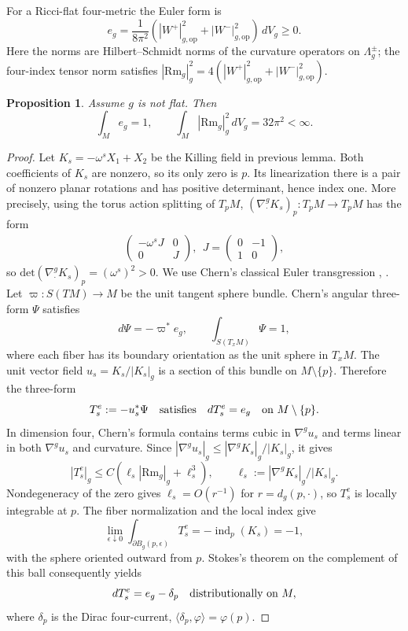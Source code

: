 \documentclass[letterpaper]{amsart}
\newtheorem{prop}[thm]{Proposition}
\theoremstyle{definition}
\theoremstyle{remark}
\def\Rm{\mathrm{Rm}}
\begin{document}
For a Ricci-flat four-metric the Euler form is
\[
 e_g=\frac1{8\pi^2}
       (|W^+|_{g,\mathrm{op}}^2+|W^-|_{g,\mathrm{op}}^2)\,dV_g\ge0.
\]
Here the norms are Hilbert--Schmidt norms of the curvature operators on
$\Lambda_g^\pm$; the four-index tensor norm satisfies
$|\Rm_g|_g^2=4(|W^+|_{g,\mathrm{op}}^2+|W^-|_{g,\mathrm{op}}^2)$.

\begin{prop}\label{notes-Euler-energy}
Assume $g$ is not flat. Then
\[
 \int_M e_g=1,\qquad \int_M|\Rm_g|_g^2\,dV_g = 32 \pi ^2<\infty.
\]
\end{prop}
\begin{proof}
	Let $K_s= -\omega^s X_1+ X_2$ be the Killing field in previous lemma. 
Both coefficients of $K_s$ are nonzero, so its only zero is $p$.
Its linearization there is a pair of nonzero planar rotations and has
positive determinant, hence index one. More precisely, using the torus action splitting of $T_pM$, $(\nabla ^{g}_{\cdot } K_s)_p: T_pM \to T_p M$ has the form
\begin{align*}
	\begin{pmatrix} -\omega^s J & 0 \\ 0 & J \end{pmatrix} , \ \ J = \begin{pmatrix} 0 & -1 \\ 1 & 0 \end{pmatrix} ,
\end{align*}
so $\mathrm{det}(\nabla ^{g}_{\cdot } K_s)_p = (\omega^s)^2 >0	.$
We use Chern's classical Euler transgression
\cite[Sections~2--3]{notes-Chern1944},
\cite[Section~1, (9)--(11), and Section~2]{notes-Chern1945}.
Let $\varpi:S(TM)\to M$ be the unit tangent sphere bundle. Chern's angular
three-form $\Psi$ satisfies
\[
 d\Psi=-\varpi^*e_g,\qquad \int_{S(T_xM)}\Psi=1,
\]
where each fiber has its boundary orientation as the unit sphere in $T_xM$.
The unit vector field $u_s=K_s/|K_s|_g$ is a section of this bundle on
$M\setminus\{p\}$. Therefore the three-form
\[
 T_s^e:=-u_s^*\Psi
 \quad\hbox{satisfies}\quad dT_s^e=e_g
 \quad\hbox{on }M\setminus\{p\}.
\]
In dimension four, Chern's formula contains terms cubic in $\nabla^g u_s$
and terms linear in both $\nabla^g u_s$ and curvature. Since
$|\nabla^g u_s|_g\le |\nabla^gK_s|_g/|K_s|_g$, it gives
\[
 |T_s^e|_g\le C(\ell_s|\Rm_g|_g+\ell_s^3),\qquad
 \ell_s:=|\nabla^gK_s|_g/|K_s|_g.
\]
Nondegeneracy of the zero gives $\ell_s=O(r^{-1})$ for
$r=d_g(p,\cdot)$, so $T_s^e$ is locally integrable at $p$.
The fiber normalization and the local index give
\[
 \lim_{\epsilon\downarrow0}\int_{\partial B_g(p,\epsilon)}T_s^e
 =-\operatorname{ind}_p(K_s)=-1,
\]
with the sphere oriented outward from $p$. Stokes's theorem on the
complement of this ball consequently yields
\[
 dT_s^e=e_g-\delta_p
 \quad\hbox{distributionally on }M,
\]
where $\delta_p$ is the Dirac four-current, $\langle\delta_p,\varphi\rangle=\varphi(p)$.


\end{proof}
\end{document}
